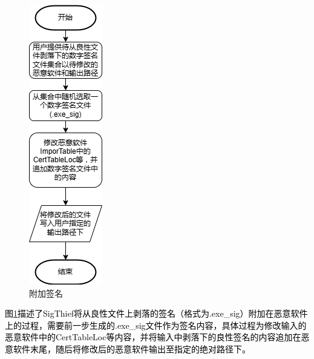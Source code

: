 \begin{figure}[htbp]
  \centering
  \includegraphics[]{images/append_signature.png}
  \caption{附加签名}\label{fig:append_signature}
\end{figure}
\textcolor{black}{图\ref{fig:append_signature}描述了SigThief将从良性文件上剥落的签名（格式为.exe\_sig）附加在恶意软件上的过程，需要前一步生成的.exe\_sig文件作为签名内容，具体过程为修改输入的恶意软件中的CertTableLoc等内容，并将输入中剥落下的良性签名的内容追加在恶意软件末尾，随后将修改后的恶意软件输出至指定的绝对路径下。}

